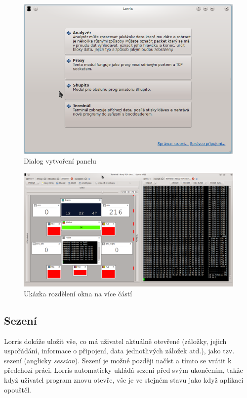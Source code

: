 \documentclass[12pt, a4paper, oneside]{article}
\newcommand{\It}{\textit}  %
\begin{document}
\begin{figure}[H]
\begin{center}
\includegraphics[scale=0.6]{img/new_tab.png}
\caption{Dialog vytvoření panelu}
\end{center}
\end{figure}

\begin{figure}[H]
\begin{center}
\includegraphics[width=\textwidth]{img/split.png}
\caption{Ukázka rozdělení okna na více částí}
\label{split_img}
\end{center}
\end{figure}

\subsection{Sezení}
Lorris dokáže uložit vše, co má uživatel aktuálně otevřené (záložky, jejich uspořádání, informace o připojení, data jednotlivých záložek atd.), jako tzv. sezení (anglicky \It{session}). Sezení je možné později načíst a tímto se vrátit k předchozí práci. Lorris automaticky ukládá sezení před svým ukončením, takže když uživatel program znovu otevře, vše je ve stejném stavu jako když aplikaci opouštěl.
\end{document}
